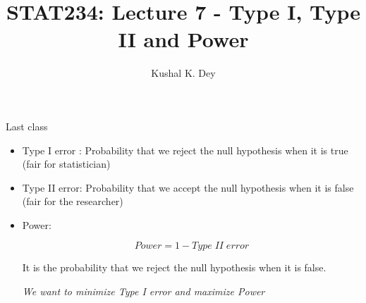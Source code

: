 \documentclass{beamer}\usepackage[]{graphicx}\usepackage[]{color}
\title{STAT234: Lecture 7 - Type I, Type II and Power}
\author{Kushal K. Dey}
\date{}
\begin{document}





\begin{frame}{}
\maketitle
\end{frame}


\begin{frame}

Last class \pause \newline

\begin{itemize}
\item Type I error : Probability that we reject the null hypothesis when it is true (fair for statistician) \pause

\item Type II error: Probability that we accept the null hypothesis when it is false (fair for the researcher) \pause

\item Power: 

$$  Power = 1 - Type \; II \; error $$

It is the probability that we reject the null hypothesis when it is false. \pause \newline

\textit{We want to minimize Type I error and maximize Power}

\end{itemize}
\end{frame}
\end{document}
